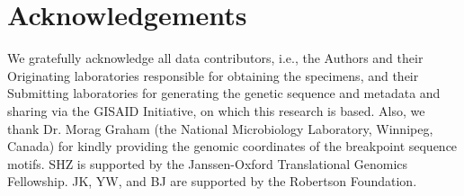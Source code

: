 \documentclass{article}
\begin{document}
\section{Acknowledgements}

We gratefully acknowledge all data contributors, i.e., the Authors and their
Originating laboratories responsible for obtaining the specimens, and their
Submitting laboratories for generating the genetic sequence and metadata and
sharing via the GISAID Initiative, on which this research is based. Also, we
thank Dr. Morag Graham (the National Microbiology Laboratory, Winnipeg, Canada)
for kindly providing the genomic coordinates of the breakpoint sequence motifs.
SHZ is supported by the Janssen-Oxford Translational Genomics Fellowship. JK,
YW, and BJ are supported by the Robertson Foundation.




\end{document}
